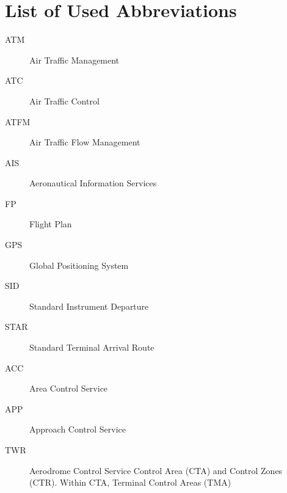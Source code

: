 \chapter{List of Used Abbreviations}

\begin{description}
\item[ATM] Air Traffic Management
\item[ATC] Air Traffic Control
\item[ATFM] Air Traffic Flow Management
\item[AIS] Aeronautical Information Services
\item[FP] Flight Plan
\item[GPS] Global Positioning System
\item[SID] Standard Instrument Departure
\item[STAR] Standard Terminal Arrival Route
\item[ACC] Area Control Service
\item[APP] Approach Control Service
\item[TWR] Aerodrome Control Service
Control Area (CTA) and Control Zones (CTR). Within CTA, Terminal Control Areas (TMA)

\end{description}